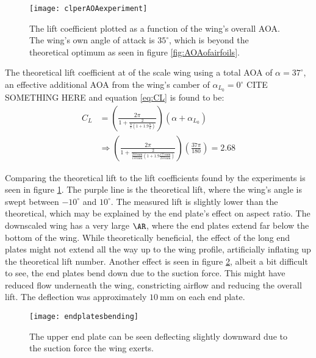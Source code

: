   \begin{figure}
    \texttt{[image: clperAOAexperiment]}
    \caption{The lift coefficient plotted as a function of the wing's overall AOA. The wing's own angle of attack is $35^\circ$, which is beyond the theoretical optimum as seen in figure \ref{fig:AOAofairfoils}.}
    \label{fig:clperAOAexperiment}
  \end{figure}

  The theoretical lift coefficient at of the scale wing using a total AOA of $\alpha = 37^\circ$, an effective additional AOA from the wing's camber of $\alpha_{L_0} = 0^\circ$ CITE SOMETHING HERE and equation \ref{eq:CL} is found to be:
  \begin{align*}
    C_L &= \left(\frac{2\pi}{1+\frac{2}{\frac{b}{c}\left(1+1.9\frac{h}{b}\right)}}\right)\left(\alpha + \alpha_{L_0}\right)\\
    &\Rightarrow
    \left(\frac{2\pi}{1+\frac{2}{\frac{\SI{250}{\milli\metre}}{\SI{150}{\milli\metre}}\left(1+1.9\frac{\SI{175}{\milli\metre}}{\SI{250}{\milli\metre}}\right)}}\right)\left(\frac{37\pi}{180}\right) = 2.68
  \end{align*}

  Comparing the theoretical lift to the lift coefficients found by the experiments is seen in figure \ref{fig:clperAOAexperiment}. The purple line is the theoretical lift, where the wing's angle is swept between $-10^\circ$ and $10^\circ$. The measured lift is slightly lower than the theoretical, which may be explained by the end plate's effect on aspect ratio. The downscaled wing has a very large $\AR$, where the end plates extend far below the bottom of the wing. While theoretically beneficial, the effect of the long end plates might not extend all the way up to the wing profile, artificially inflating up the theoretical lift number. Another effect is seen in figure \ref{fig:endplatesbending}, albeit a bit difficult to see, the end plates bend down due to the suction force. This might have reduced flow underneath the wing, constricting airflow and reducing the overall lift. The deflection was approximately $\SI{10}{\milli\metre}$ on each end plate.

  \begin{figure}
    \texttt{[image: endplatesbending]}
    \caption{The upper end plate can be seen deflecting slightly downward due to the suction force the wing exerts. }
    \label{fig:endplatesbending}
  \end{figure}
